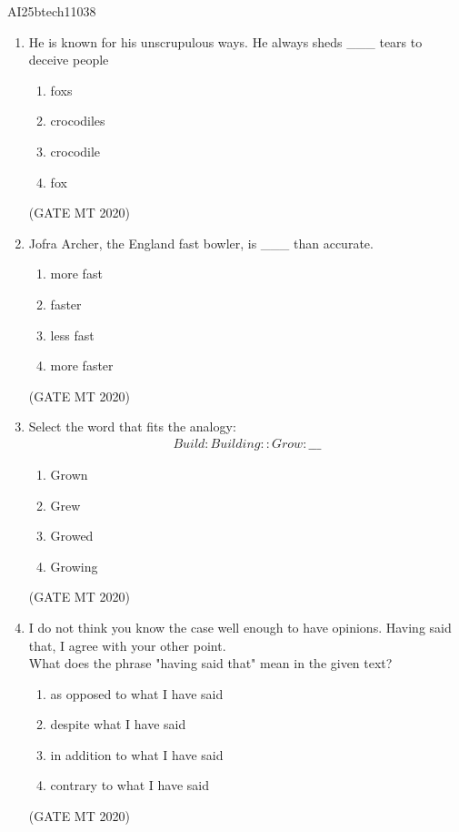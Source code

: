 \documentclass[journal, 11pt, onecolumn]{IEEEtran}
\theoremstyle{remark}
\begin{document}
\begin{center}
    \Large{AI25btech11038}
\end{center} 

\begin{enumerate}

\item He is known for his unscrupulous ways. He always sheds \_\_\_ tears to deceive people
\begin{multicols}{4}
\begin{enumerate}
    \item fox\textquotesingle s
    \item crocodile\textquotesingle s
    \item crocodile
    \item fox
\end{enumerate}
\end{multicols}
\hfill(GATE MT 2020)

\item Jofra Archer, the England fast bowler, is \_\_\_ than accurate.
\begin{multicols}{4}
\begin{enumerate}
    \item more fast 
    \item faster
    \item less fast
    \item more faster
\end{enumerate}
\end{multicols}
\hfill(GATE MT 2020)

\item Select the word that fits the analogy: 
\begin{align}
    Build: Building :: Grow: \_\_\_
\end{align}
\begin{multicols}{4}
\begin{enumerate}
    \item Grown 
    \item Grew
    \item Growed
    \item Growing
\end{enumerate}
\end{multicols}
\hfill(GATE MT 2020)

\item I do not think you know the case well enough to have opinions. Having said that, I agree with your other point.\\
What does the phrase "having said that" mean in the given text?
\begin{multicols}{2}
\begin{enumerate}
    \item as opposed to what I have said 
    \item despite what I have said
    \item in addition to what I have said
    \item contrary to what I have said
\end{enumerate}
\end{multicols}
\hfill(GATE MT 2020)


\end{enumerate}
\end{document}
